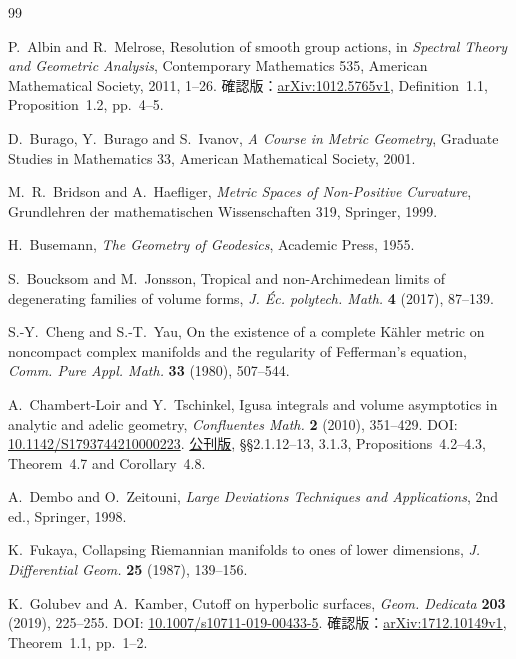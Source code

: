 \documentclass[11pt,a4paper]{ltjsarticle}
\theoremstyle{plain}
\theoremstyle{definition}
\theoremstyle{remark}
\begin{document}
\small
\begin{thebibliography}{99}

P.~Albin and R.~Melrose,
\newblock Resolution of smooth group actions,
\newblock in \emph{Spectral Theory and Geometric Analysis},
Contemporary Mathematics 535, American Mathematical Society, 2011, 1--26.
\newblock 確認版：\href{https://arxiv.org/abs/1012.5765v1}{arXiv:1012.5765v1},
Definition~1.1, Proposition~1.2, pp.~4--5.


D.~Burago, Y.~Burago and S.~Ivanov,
\newblock \emph{A Course in Metric Geometry},
\newblock Graduate Studies in Mathematics 33, American Mathematical Society, 2001.

M.~R.~Bridson and A.~Haefliger,
\newblock \emph{Metric Spaces of Non-Positive Curvature},
\newblock Grundlehren der mathematischen Wissenschaften 319, Springer, 1999.

H.~Busemann,
\newblock \emph{The Geometry of Geodesics},
\newblock Academic Press, 1955.

S.~Boucksom and M.~Jonsson,
\newblock Tropical and non-Archimedean limits of degenerating families of volume forms,
\newblock \emph{J. \'{E}c. polytech. Math.} \textbf{4} (2017), 87--139.

S.-Y.~Cheng and S.-T.~Yau,
\newblock On the existence of a complete K\"ahler metric on noncompact complex manifolds and the regularity of Fefferman's equation,
\newblock \emph{Comm. Pure Appl. Math.} \textbf{33} (1980), 507--544.

A.~Chambert-Loir and Y.~Tschinkel,
\newblock Igusa integrals and volume asymptotics in analytic and adelic geometry,
\newblock \emph{Confluentes Math.} \textbf{2} (2010), 351--429.
\newblock DOI: \href{https://doi.org/10.1142/S1793744210000223}{10.1142/S1793744210000223}.
\newblock \href{https://www.numdam.org/item/CML_2010__2_3_351_0.pdf}{公刊版},
\S\S2.1.12--13, 3.1.3, Propositions~4.2--4.3, Theorem~4.7 and Corollary~4.8.

A.~Dembo and O.~Zeitouni,
\newblock \emph{Large Deviations Techniques and Applications}, 2nd ed.,
\newblock Springer, 1998.

K.~Fukaya,
\newblock Collapsing Riemannian manifolds to ones of lower dimensions,
\newblock \emph{J. Differential Geom.} \textbf{25} (1987), 139--156.

K.~Golubev and A.~Kamber,
\newblock Cutoff on hyperbolic surfaces,
\newblock \emph{Geom. Dedicata} \textbf{203} (2019), 225--255.
\newblock DOI: \href{https://doi.org/10.1007/s10711-019-00433-5}{10.1007/s10711-019-00433-5}.
\newblock 確認版：\href{https://arxiv.org/abs/1712.10149v1}{arXiv:1712.10149v1},
Theorem~1.1, pp.~1--2.


\end{thebibliography}
\end{document}
